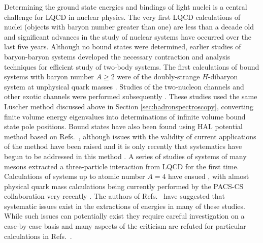 Determining the ground state energies and bindings of light nuclei is a central challenge for LQCD in nuclear physics. The very first LQCD calculations of nuclei (objects with baryon number greater than one) are less than a decade old and significant advances in the study of nuclear systems have occurred over the last five years. Although no bound states were determined, earlier studies of baryon-baryon systems \cite{Beane:2006gf,Beane:2006mx,Aoki93,Beane:2009gs,Beane:2009kya}  developed the necessary contraction and analysis techniques for efficient study of two-body systems. 
The first calculations of bound systems with baryon number $A\ge2$ were of the doubly-strange $H$-dibaryon system at unphysical quark masses \cite{Beane:2010hg,Inoue:2010es,Beane:2011xf}. 
Studies of the two-nucleon channels \cite{Beane:2011iw} and other exotic channels were performed subsequently \cite{Berkowitz:2015eaa,Francis:2018qch,Wagman:2017tmp,MORE}. These studies used the same L\"uscher method discussed above in Section \ref{sec:hadronspectroscopy}, converting finite volume energy eigenvalues into determinations of infinite volume bound state pole positions. Bound states have also been found using HAL potential method \cite{Ishii:2006ec} based on Refs.~\cite{Luscher:1986pf,Lin:2001ek}, although issues with the validity of current applications of the method have been raised  \cite{Detmold:2007wk,Birse:2012ph,Yamazakiteal} and it is only recently that systematics have begun to be addressed in this method \cite{Doi:2017}.
A series of studies of systems of many mesons \cite{Beane:2007es,Detmold:2008yn,Detmold:2011kw} extracted a three-particle interaction from LQCD for the first time.
Calculations of systems up to atomic number $A=4$  have ensued \cite{Beane:2012vq,Yamazaki:2012hi,Yamazaki:2015asa}, with almost physical quark mass calculations being currently performed by the PACS-CS collaboration very recently \cite{Ref:PACSCS}. The authors of Refs.~\cite{Iritani,Doi} have suggested that systematic issues exist in the extractions of energies in many of these studies. While such issues can potentially exist they require careful investigation on a case-by-case basis and many aspects of the criticism are refuted for particular calculations in Refs.~\cite{Beane:2017edf,Yamazakilatticetalk}.

